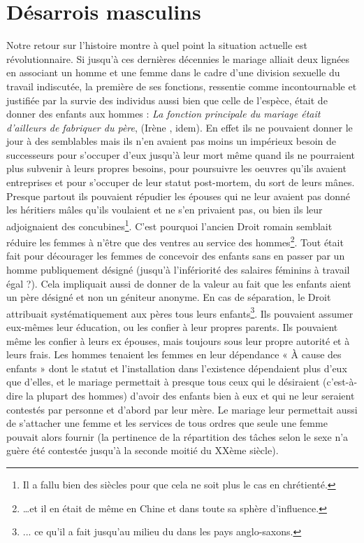 
\chapter{Désarrois masculins}


 Notre retour sur l'histoire montre à quel point la situation actuelle est révolutionnaire. 
Si jusqu'à ces dernières décennies le mariage alliait deux lignées en associant un homme et une femme dans le cadre d'une division sexuelle du travail indiscutée, la première de ses fonctions, ressentie comme incontournable et justifiée par la survie des individus aussi bien que celle de l'espèce, était de donner des enfants aux hommes :
\emph{La fonction principale du mariage était d'ailleurs de fabriquer du père}, (Irène , idem). En effet ils ne pouvaient donner le jour à des semblables mais ils n'en avaient pas moins un impérieux besoin de successeurs pour s'occuper d'eux jusqu'à leur mort même quand ils ne pourraient plus subvenir à leurs propres besoins, pour poursuivre les oeuvres qu'ils avaient entreprises et pour s'occuper de leur statut post-mortem, du sort de leurs mânes.  Presque partout ils pouvaient répudier les épouses qui ne leur avaient pas donné les héritiers mâles qu'ils voulaient et ne s'en privaient pas, ou bien ils leur adjoignaient des concubines\footnote{Il a fallu bien des siècles pour que cela ne soit plus le cas en chrétienté.}. C'est pourquoi l'ancien Droit romain semblait réduire les femmes à n'être que des ventres au service des hommes\footnote{…et il en était de même en Chine et dans toute sa sphère d'influence.}. Tout était fait pour décourager les femmes de concevoir des enfants sans en passer par un homme publiquement désigné (jusqu'à l'infériorité des salaires féminins à travail égal ?). Cela impliquait aussi de donner de la valeur au fait que les enfants aient un père désigné et non un géniteur anonyme. En cas de séparation, le Droit attribuait systématiquement aux pères tous leurs enfants\footnote{... ce qu'il a fait jusqu'au milieu du  dans les pays anglo-saxons.}. Ils pouvaient assumer eux-mêmes leur éducation, ou les confier à leur propres parents. Ils pouvaient même les confier à leurs ex épouses, mais toujours sous leur propre autorité et à leurs frais. Les hommes tenaient les femmes en leur dépendance « À cause des enfants » dont le statut et l'installation dans l'existence dépendaient plus d'eux que d'elles, et le mariage permettait à presque tous ceux qui le désiraient (c'est-à-dire la plupart des hommes) d'avoir des enfants bien à eux et qui ne leur seraient contestés par personne et d'abord par leur mère. Le mariage leur permettait aussi de s'attacher une femme et les services de tous ordres que seule une femme pouvait alors fournir (la pertinence de la répartition des tâches selon le sexe n'a guère été contestée jusqu'à la seconde moitié du XXème siècle). 
 
